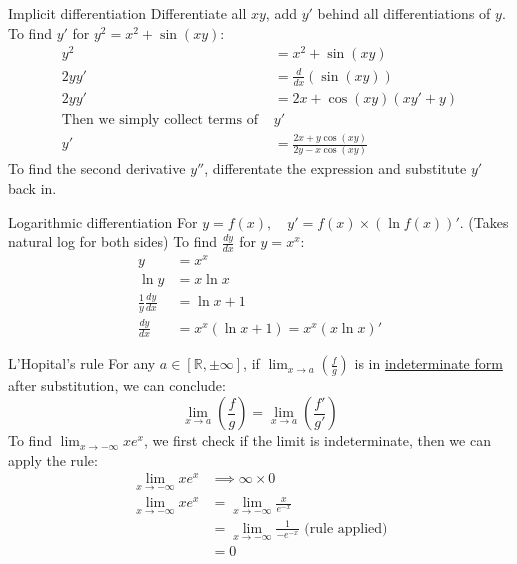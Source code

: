 \documentclass{article}
\begin{document}
\begin{knBox}
    {Implicit differentiation}
    Differentiate all $xy$, add $y'$ behind all differentiations of $y$.
    \tcblower
    To find $y'$ for $y^2=x^2+\sin(xy)$:
    \begin{align*}
        y^2                                     & =x^2+\sin(xy)                      \\
        2yy'                                    & =\frac{d}{dx}(\sin(xy))            \\
        2yy'                                    & =2x+\cos(xy)(xy'+y)                \\
        \text{Then we simply collect terms of } & y'                                 \\
        y'                                      & =\frac{2x+y\cos(xy)}{2y-x\cos(xy)}
    \end{align*}
    To find the second derivative $y''$, differentate the expression and substitute $y'$ back in.
\end{knBox}
\begin{knBox}
    {Logarithmic differentiation}
    For $y=f(x),\quad y'=f(x)\times(\ln f(x))'$. (Takes natural log for both sides)
    \tcblower
    To find $\frac{dy}{dx}$ for $y=x^x$:
    \begin{align*}
        y                        & =x^x                         \\
        \ln y                    & =x\ln x                      \\
        \frac{1}{y}\frac{dy}{dx} & =\ln x+1                     \\
        \frac{dy}{dx}            & =x^x(\ln x+1) = x^x(x\ln x)'
    \end{align*}
\end{knBox}
\label{sec:lhr}
\begin{theorem}
    {L'Hopital's rule}
    For any $a\in [\mathds{R}, \pm\infty]$, if $\lim_{x\to a}(\frac{f}{g})$ is in \hyperref[sec:indeterminate]{indeterminate form} after substitution, we can conclude:
    \[\lim_{x\to a}(\frac{f}{g})=\lim_{x\to a}(\frac{f'}{g'})\]
    \tcblower
    To find $\lim_{x\to-\infty}xe^x$, we first check if the limit is indeterminate, then we can apply the rule:
    \begin{align*}
        \lim_{x\to-\infty}xe^x & \implies \infty\times0                                      \\
        \lim_{x\to-\infty}xe^x & = \lim_{x\to-\infty}\frac{x}{e^{-x}}                        \\
                               & = \lim_{x\to-\infty}\frac{1}{-e^{-x}}\text{ (rule applied)} \\
                               & = 0
    \end{align*}
\end{theorem}
\end{document}
